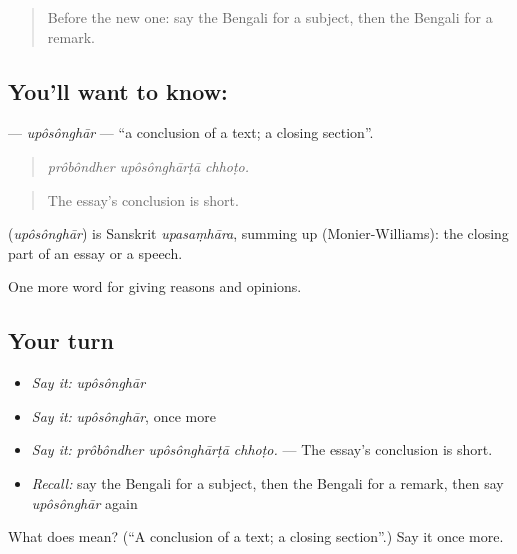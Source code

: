 \begin{quote}
Before the new one: say the Bengali for a subject, then the Bengali for a remark.
\end{quote}

\subsection*{You'll want to know: }
\textbf{} — \emph{upôsônghār} — \textquotedblleft{}a conclusion of a text; a closing section\textquotedblright{}.

\begin{quote}
  
\end{quote}

\begin{quote}
\emph{prôbôndher upôsônghārṭā chhoṭo.}
\end{quote}

\begin{quote}
The essay's conclusion is short.
\end{quote}

\begin{cousinweb}
\textbf{} (\emph{upôsônghār}) is Sanskrit \emph{upasaṃhāra}, summing up (Monier-Williams): the closing part of an essay or a speech.
\end{cousinweb}

\begin{grammarlens}[title={What you've built}]
One more word for giving reasons and opinions.
\end{grammarlens}

\subsection*{Your turn}
\begin{itemize}
\raggedright
  \item \emph{Say it:} \emph{upôsônghār}
  \item \emph{Say it:} \emph{upôsônghār}, once more
  \item \emph{Say it:} \emph{prôbôndher upôsônghārṭā chhoṭo.} — The essay's conclusion is short.
  \item \emph{Recall:} say the Bengali for a subject, then the Bengali for a remark, then say \emph{upôsônghār} again
\end{itemize}

\begin{tcolorbox}[breakable,colback=teal!4,colframe=teal!35!black,title={Before you move on}]
What does  mean? (\textquotedblleft{}A conclusion of a text; a closing section\textquotedblright{}.) Say it once more.
\end{tcolorbox}
